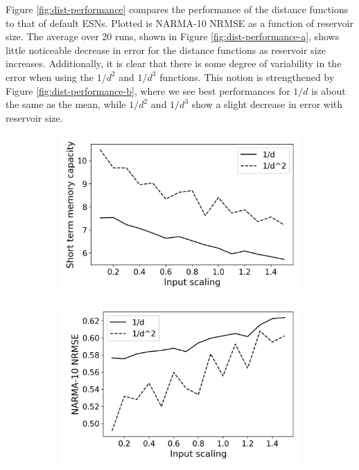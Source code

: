 Figure \ref{fig:dist-performance} compares the performance of the distance
functions to that of default ESNs. Plotted is NARMA-10 NRMSE as a function of
reservoir size. The average over 20 runs, shown in Figure
\ref{fig:dist-performance-a}, shows little noticeable decrease in error for the
distance functions as reservoir size increases. Additionally, it is clear that
there is some degree of variability in the error when using the $1/d^2$ and
$1/d^3$ functions. This notion is strengthened by Figure
\ref{fig:dist-performance-b}, where we see best performances for $1/d$ is about
the same as the mean, while $1/d^2$ and $1/d^3$ show a slight decrease in error
with reservoir size.

\begin{figure}[t]
  \centering
  \begin{subfigure}{.49\textwidth}
    \centering
    \includegraphics[width=1.0\linewidth]{figures/RGG-dist-mc.png}
    \caption{}
    \label{fig:dist-performance-is-a}
  \end{subfigure}
  \begin{subfigure}{.49\textwidth}
    \centering
    \includegraphics[width=1.0\linewidth]{figures/RGG-dist-performance-is.png}

\end{subfigure}
\end{figure}
